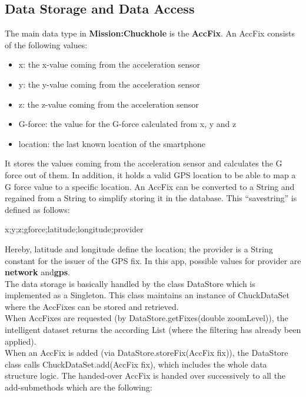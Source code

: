 \documentclass[10pt,a4paper]{article} %
\begin{document}
	\subsection{Data Storage and Data Access}\label{subsec:datastorage}

	The main data type in \textbf{Mission:Chuckhole} is the \textbf{AccFix}.
	An AccFix consists of the following values:

	\begin{itemize}
		\item x: the x-value coming from the acceleration sensor
		\item y: the y-value coming from the acceleration sensor
		\item z: the z-value coming from the acceleration sensor
		\item G-force: the value for the G-force calculated from x, y and z
		\item location: the last known location of the smartphone
	\end{itemize}

	It stores the values coming from the acceleration sensor and calculates the G force out of them.
	In addition, it holds a valid GPS location to be able to map a G force value to a specific location.
	An AccFix can be converted to a String and regained from a String to simplify storing it in the database.
	This ``savestring'' is defined as follows:

	\begin{center}
		x;y;z;gforce;latitude;longitude;provider
	\end{center}
	
	Hereby, latitude and longitude define the location; the provider is a String constant for the issuer of the GPS fix.
	In this app, possible values for provider are \textbf{network} and\textbf{gps}.\\

	The data storage is basically handled by the class DataStore which is implemented as a Singleton.
	This class maintains an instance of ChuckDataSet where the AccFixes can be stored and retrieved.\\
	When AccFixes are requested (by DataStore.getFixes(double zoomLevel)), the intelligent dataset returns the according List (where the filtering has already been applied).\\
	When an AccFix is added (via DataStore.storeFix(AccFix fix)), the DataStore class calls ChuckDataSet.add(AccFix fix), which includes the whole data structure logic.
	The handed-over AccFix is handed over successively to all the add-submethods which are the following: %
\end{document}
